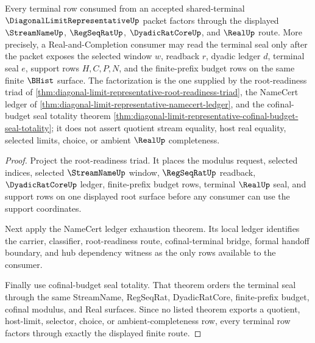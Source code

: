 \begin{theorem}
\label{thm:diagonal-limit-representative-terminal-row-coverage}
Every terminal row consumed from an accepted shared-terminal $\DiagonalLimitRepresentativeUp$ packet factors through the displayed $\StreamNameUp$, $\RegSeqRatUp$, $\DyadicRatCoreUp$, and $\RealUp$ route. More precisely, a Real-and-Completion consumer may read the terminal seal only after the packet exposes the selected window $w$, readback $r$, dyadic ledger $d$, terminal seal $e$, support rows $H,C,P,N$, and the finite-prefix budget rows on the same finite $\BHist$ surface. The factorization is the one supplied by the root-readiness triad of \autoref{thm:diagonal-limit-representative-root-readiness-triad}, the NameCert ledger of \autoref{thm:diagonal-limit-representative-namecert-ledger}, and the cofinal-budget seal totality theorem \autoref{thm:diagonal-limit-representative-cofinal-budget-seal-totality}; it does not assert quotient stream equality, host real equality, selected limits, choice, or ambient $\RealUp$ completeness.
\end{theorem}
\begin{proof}
Project the root-readiness triad. It places the modulus request, selected indices, selected $\StreamNameUp$ window, $\RegSeqRatUp$ readback, $\DyadicRatCoreUp$ ledger, finite-prefix budget rows, terminal $\RealUp$ seal, and support rows on one displayed root surface before any consumer can use the support coordinates.

Next apply the NameCert ledger exhaustion theorem. Its local ledger identifies the carrier, classifier, root-readiness route, cofinal-terminal bridge, formal handoff boundary, and hub dependency witness as the only rows available to the consumer.

Finally use cofinal-budget seal totality. That theorem orders the terminal seal through the same StreamName, RegSeqRat, DyadicRatCore, finite-prefix budget, cofinal modulus, and Real surfaces. Since no listed theorem exports a quotient, host-limit, selector, choice, or ambient-completeness row, every terminal row factors through exactly the displayed finite route.
\end{proof}

